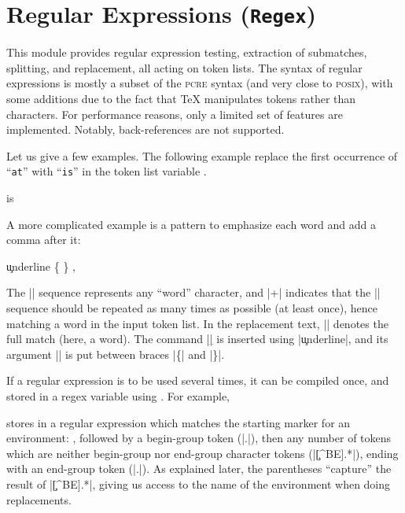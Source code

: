 \documentclass[oneside]{book}
\begin{document}
\chapter{Regular Expressions (\texttt{Regex})}

This module provides regular expression testing,
extraction of submatches, splitting, and replacement, all acting
on token lists. The syntax of regular expressions is mostly a subset
of the \textsc{pcre} syntax (and very close to \textsc{posix}),
with some additions
due to the fact that \TeX{} manipulates tokens rather than characters.
For performance reasons, only a limited set of features are implemented.
Notably, back-references are not supported.

Let us give a few examples. The following example replace the first
occurrence of \enquote{\texttt{at}} with \enquote{\texttt{is}}
in the token list variable .
\begin{demohigh}
\TlSet {}
 {is} \lTmpaTl
\TlUse \lTmpaTl
\end{demohigh}
A more complicated example is
a pattern to emphasize each word and add a comma after it:
\begin{demohigh}
\TlSet {}
\RegexReplaceAll {\w+} {\c{underline} \cB\{ \0 \cE\} ,} \lTmpaTl
\TlUse \lTmpaTl
\end{demohigh}
The |\w| sequence represents any \enquote{word} character, and |+|
indicates that the |\w| sequence should be repeated as many times as
possible (at least once), hence matching a word in the input token
list. In the replacement text, |\0| denotes the full match (here, a
word).  The command |\underline| is inserted using |\c{underline}|,
and its argument |\0| is put between braces |\cB\{| and |\cE\}|.

If a regular expression is to be used several times,
it can be compiled once, and stored in a regex
variable using . For example,
\begin{codehigh}
\RegexNew \lFooRegex
\RegexSet {}
\end{codehigh}
stores in  a regular expression which matches the
starting marker for an environment: , followed by a
begin-group token (|\cB.|), then any number of tokens which are
neither begin-group nor end-group character tokens (|\c[^BE].*|),
ending with an end-group token (|\cE.|). As explained later,
the parentheses \enquote{capture} the result of |\c[^BE].*|,
giving us access to the name of the environment when doing
replacements.
\end{document}
